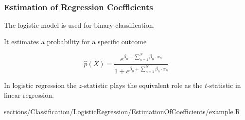 \subsubsection{Estimation of Regression Coefficients}
	\RTheory
	{
		The logistic model is used for binary classification. 
		
		It estimates a probability for a specific outcome
		
		$$\hat{p}(X) = \frac{e^{\beta_0 + \sum\limits_{n=1}^N \beta_n \cdot x_n}}{1 + e^{\beta_0 + \sum\limits_{n=1}^N \beta_n \cdot x_n}}$$
		
		In logistic regression the $z$-statistic plays the equivalent role as the $t$-statistic in linear regression.
	}
	{
		sections/Classification/LogisticRegression/EstimationOfCoefficients/example.R
	}